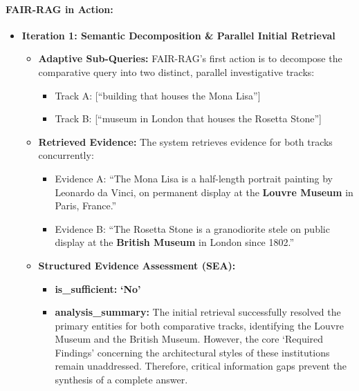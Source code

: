 \documentclass[11pt]{article}
\begin{document}
\paragraph{FAIR-RAG in Action:}
\begin{itemize}
    \item \textbf{Iteration 1: Semantic Decomposition \& Parallel Initial Retrieval}
    \begin{itemize}
        \item \textbf{Adaptive Sub-Queries:} FAIR-RAG's first action is to decompose the comparative query into two distinct, parallel investigative tracks:
        \begin{itemize}
            \item Track A: [``building that houses the Mona Lisa'']
            \item Track B: [``museum in London that houses the Rosetta Stone'']
        \end{itemize}
        \item \textbf{Retrieved Evidence:} The system retrieves evidence for both tracks concurrently:
        \begin{itemize}
            \item Evidence A: ``The Mona Lisa is a half-length portrait painting by Leonardo da Vinci, on permanent display at the \textbf{Louvre Museum} in Paris, France.''
            \item Evidence B: ``The Rosetta Stone is a granodiorite stele on public display at the \textbf{British Museum} in London since 1802.''
        \end{itemize}
        \item \textbf{Structured Evidence Assessment (SEA):}
        \begin{itemize}
            \item \textbf{is\_sufficient:} \textbf{`No'}
            \item \textbf{analysis\_summary:} The initial retrieval successfully resolved the primary entities for both comparative tracks, identifying the Louvre Museum and the British Museum. However, the core `Required Findings' concerning the architectural styles of these institutions remain unaddressed. Therefore, critical information gaps prevent the synthesis of a complete answer.
        \end{itemize}
    \end{itemize}
    

\end{itemize}
\end{document}
